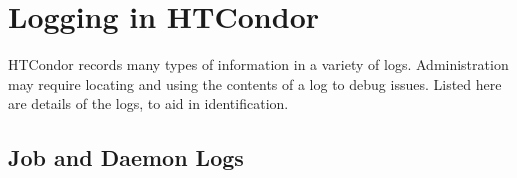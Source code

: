\section{\label{sec:logging}Logging in HTCondor}
HTCondor records many types of information in a variety of logs.
Administration may require locating and using the
contents of a log to debug issues.
Listed here are details of the logs, to aid in identification.

\subsection{\label{sec:job-systemlogs}Job and Daemon Logs}

